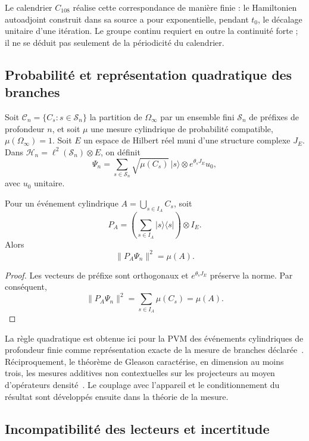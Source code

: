 Le calendrier \(C_{108}\) réalise cette correspondance de manière finie :
le Hamiltonien autoadjoint construit dans sa source a pour
exponentielle, pendant \(t_0\), le décalage unitaire d’une itération. Le
groupe continu requiert en outre la continuité forte ; il ne se déduit pas
seulement de la périodicité du calendrier.

\subsection{Probabilité et représentation quadratique des branches}

Soit \(\mathcal C_n=\{C_s:s\in\mathcal S_n\}\) la partition de \(\Omega_\infty\) par un ensemble fini \(\mathcal S_n\) de préfixes de profondeur \(n\), et soit \(\mu\) une mesure cylindrique de probabilité compatible, \(\mu(\Omega_\infty)=1\). Soit \(E\) un espace de Hilbert réel muni d’une structure complexe \(J_E\). Dans \(\mathcal H_n=\ell^2(\mathcal S_n)\otimes E\), on définit
\begin{equation}
 \Psi_n=\sum_{s\in\mathcal S_n}
 \sqrt{\mu(C_s)}\,|s\rangle\otimes e^{\theta_s J_E}u_0,
 \label{eq:estado-amplitudes-medida-rev2}
\end{equation}
avec \(u_0\) unitaire.

\begin{theorem}
\label{thm:born-cilindrico-rev2}
Pour un événement cylindrique \(A=\bigcup_{s\in I_A}C_s\), soit
\[
 P_A=\left(\sum_{s\in I_A}|s\rangle\langle s|\right)\otimes I_E.
\]
Alors
\[
 \|P_A\Psi_n\|^2=\mu(A).
\]
\end{theorem}

\begin{proof}
Les vecteurs de préfixe sont orthogonaux et \(e^{\theta_s J_E}\) préserve la norme. Par conséquent,
\[
 \|P_A\Psi_n\|^2
 =\sum_{s\in I_A}\mu(C_s)=\mu(A).
\]
\end{proof}

La règle quadratique est obtenue ici pour la PVM des événements cylindriques de profondeur finie comme représentation exacte de la mesure de branches déclarée~\cite{Born1926}. Réciproquement, le théorème de Gleason caractérise, en dimension au moins trois, les mesures additives non contextuelles sur les projecteurs au moyen d’opérateurs densité~\cite{Gleason1957}. Le couplage avec l’appareil et le conditionnement du résultat sont développés ensuite dans la théorie de la mesure.

\subsection{Incompatibilité des lecteurs et incertitude}

